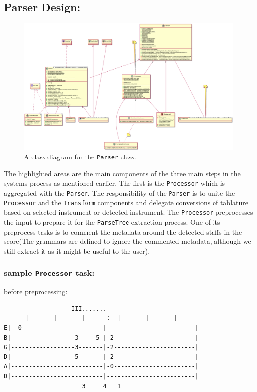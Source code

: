 \documentclass[11pt]{article}
\begin{document}
\subsection{Parser Design:}
\label{sec:org9d8e2b4}
\begin{figure}[htbp]
\centering
\includegraphics[width=.9\linewidth]{./Diagrams/backend-parser-class-diagram.png}
\caption{A class diagram for the \texttt{Parser} class.}
\end{figure}

The highlighted areas are the main components of the three main steps in the systems process as mentioned earlier. The first is the \texttt{Processor} which is aggregated with the \texttt{Parser}. The responsibility of the \texttt{Parser} is to unite the \texttt{Processor} and the \texttt{Transform} components and delegate conversions of tablature based on selected instrument or detected instrument. The \texttt{Processor} preprocesses the input to prepare it for the \texttt{ParseTree} extraction process. One of its preprocess tasks is to comment the metadata around the detected staffs in the score(The grammars are defined to ignore the commented metadata, although we still extract it as it might be useful to the user). 


\subsubsection{sample \texttt{Processor} task:}
\label{sec:orgd5f1ad7}
before preprocessing:
\begin{verbatim}
	               III.......
	  |       |       |      :  |       |       |
E|--0-----------------------|-------------------------|
B|------------------3-----5-|-2-----------------------|
G|------------------3-------|-2-----------------------|
D|------------------5-------|-2-----------------------|
A|--------------------------|-0-----------------------|
D|--------------------------|-------------------------|
	                  3     4   1
\end{verbatim}
\end{document}

